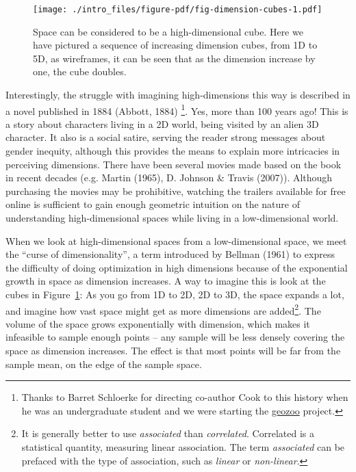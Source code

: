 \documentclass[
  letterpaper,
]{book}
\begin{document}
\begin{figure}

{\centering \texttt{[image: ./intro\_files/figure-pdf/fig-dimension-cubes-1.pdf]}

}

\caption{\label{fig-dimension-cubes}Space can be considered to be a
high-dimensional cube. Here we have pictured a sequence of increasing
dimension cubes, from 1D to 5D, as wireframes, it can be seen that as
the dimension increase by one, the cube doubles.}

\end{figure}

Interestingly, the struggle with imagining high-dimensions this way is
described in a novel published in 1884 (Abbott, 1884) \footnote{Thanks
  to Barret Schloerke for directing co-author Cook to this history when
  he was an undergraduate student and we were starting the
  \href{http://schloerke.com/geozoo/}{geozoo} project.}. Yes, more than
100 years ago! This is a story about characters living in a 2D world,
being visited by an alien 3D character. It also is a social satire,
serving the reader strong messages about gender inequity, although this
provides the means to explain more intricacies in perceiving dimensions.
There have been several movies made based on the book in recent decades
(e.g. Martin (1965), D. Johnson \& Travis (2007)). Although purchasing
the movies may be prohibitive, watching the trailers available for free
online is sufficient to gain enough geometric intuition on the nature of
understanding high-dimensional spaces while living in a low-dimensional
world.

When we look at high-dimensional spaces from a low-dimensional space, we
meet the ``curse of dimensionality'', a term introduced by Bellman
(1961) to express the difficulty of doing optimization in high
dimensions because of the exponential growth in space as dimension
increases. A way to imagine this is look at the cubes in
Figure~\ref{fig-dimension-cubes}: As you go from 1D to 2D, 2D to 3D, the
space expands a lot, and imagine how vast space might get as more
dimensions are added\footnote{It is generally better to use
  \emph{associated} than \emph{correlated}. Correlated is a statistical
  quantity, measuring linear association. The term \emph{associated} can
  be prefaced with the type of association, such as \emph{linear} or
  \emph{non-linear}.}. The volume of the space grows exponentially with
dimension, which makes it infeasible to sample enough points -- any
sample will be less densely covering the space as dimension increases.
The effect is that most points will be far from the sample mean, on the
edge of the sample space.
\end{document}
